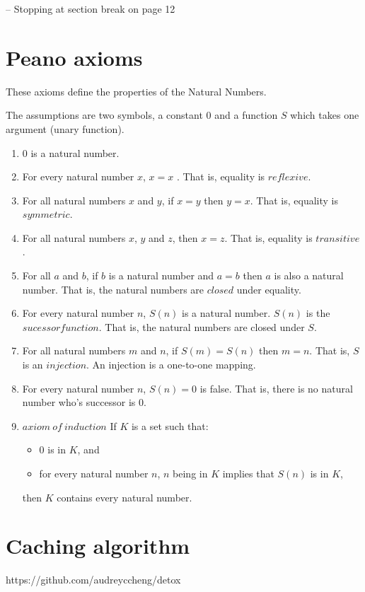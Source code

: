 \documentclass[]{scrartcl}
\begin{document}
-- Stopping at section break on page 12


\section{Peano axioms}

These axioms define the properties of the Natural Numbers.

The assumptions are two symbols, a constant $0$ and a function $S$ which takes one argument (unary function).

\begin{enumerate}
	\item 0 is a natural number.
	
	\item For every natural number $x$, $x=x$ . That is, equality is $reflexive$.
	
	\item For all natural numbers $x$ and $y$, if $x=y$ then $y=x$. That is, equality is $symmetric$.
	
	\item For all natural numbers $x$, $y$ and $z$, then $x=z$. That is, equality is $transitive$.
	
	\item For all $a$ and $b$, if $b$ is a natural number and $a=b$ then $a$ is also a natural number. That is, the natural numbers are $closed$ under equality.
	
	\item For every natural number $n$, $S(n)$ is a natural number. $S(n)$ is the $sucessor function$. That is, the natural numbers are closed under $S$.
	
	\item For all natural numbers $m$ and $n$, if $S(m) = S(n)$ then $m=n$. That is, $S$ is an $injection$. An injection is a one-to-one mapping.
	
	\item For every natural number $n$, $S(n)=0$ is false. That is, there is no natural number who's successor is 0.
	
	\item $axiom\ of\ induction$ If $K$ is a set such that:
	\begin{itemize}
		\item $0$ is in $K$, and
		
		\item for every natural number $n$, $n$ being in $K$ implies that $S(n)$ is in $K$,
	\end{itemize}
	then $K$ contains every natural number.
	
\end{enumerate}



\section{Caching algorithm}

https://github.com/audreyccheng/detox
\end{document}

